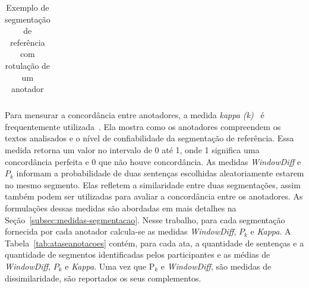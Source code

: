 \begin{table}[!h]
\begin{tabular}{|p{0.2cm}p{}|}




	\end{tabular}
	\caption{Exemplo de segmentação de referência com rotulação de um anotador}
	\label{tab:segmentacaoreferencia}
\end{table}









  




Para mensurar a concordância entre anotadores, a medida \textit{kappa (k)}~\cite{Carletta1996} é frequentemente utilizada~\cite{Gruenstein2007, Cardoso2017, Hearst1997}. Ela mostra como os anotadores compreendem os textos analisados e o nível de confiabilidade da segmentação de referência. Essa medida retorna um valor no intervalo de 0 até 1, onde 1 significa uma concordância perfeita e 0 que não houve concordância. 
As medidas \textit{WindowDiff} e $P_k$ informam a probabilidade de duas sentenças escolhidas aleatoriamente estarem no mesmo segmento. Elas refletem a similaridade entre duas segmentações, assim também podem ser utilizadas para avaliar a concordância entre os anotadores. As formulações dessas medidas são abordadas em mais detalhes na Seção~\ref{subsec:medidas-segmentacao}.
Nesse trabalho, para cada segmentação fornecida por cada anotador calcula-se as medidas \textit{WindowDiff}, $P_k$ e \textit{Kappa}.
A Tabela~\ref{tab:ataseanotacoes} contém, para cada ata, a quantidade de sentenças e a quantidade de segmentos identificadas pelos participantes e as médias de \textit{WindowDiff}, $P_k$ e \textit{Kappa}. Uma vez que P$_k$ e \textit{WindowDiff}, são medidas de dissimilaridade, são reportados os seus complementos.

